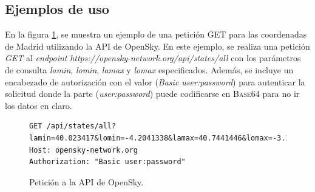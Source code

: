 \documentclass[a4paper, 11pt]{book}
\begin{document}
\subsection{Ejemplos de uso}
En la figura \ref{fig:getOpensky}, se muestra un ejemplo de una petición GET para las coordenadas de Madrid utilizando la API de OpenSky.
En este ejemplo, se realiza una petición \emph{GET} al \emph{endpoint} \emph{https://opensky-network.org/api/states/all} con los parámetros de consulta \emph{lamin}, \emph{lomin}, \emph{lamax} y \emph{lomax} especificados. Además, se incluye un encabezado de autorización con el valor (\emph{Basic user:password}) para autenticar la solicitud donde la parte (\emph{user:password}) puede codificarse en \textsc{Base64} para no ir los datos en claro.
\begin{figure}[h]
	\centering
\begin{verbatim}
GET /api/states/all?lamin=40.023417&lomin=-4.2041338&lamax=40.7441446&lomax=-3.2538165
Host: opensky-network.org
Authorization: "Basic user:password"
\end{verbatim}
  \caption{Petición a la API de OpenSky.}
\label{fig:getOpensky}
\end{figure}
\end{document}
